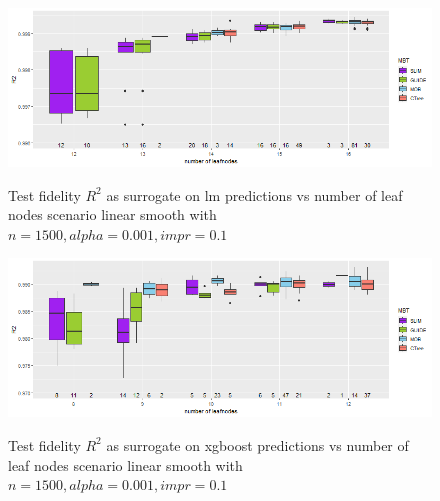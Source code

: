 \begin{figure}
\caption{Test fidelity $R^2$ as surrogate on lm predictions vs number of leaf nodes scenario linear smooth with $n=1500, alpha = 0.001, impr = 0.1$}
    \includegraphics[width=16cm]{Figures/simulations/batchtools/basic_scenarios/linear_smooth/ls_1000_lm_r2_test.png}
    \label{fig:app_ls_1000_lm_r2_test}
\end{figure} 

\begin{figure}
\caption{Test fidelity $R^2$ as surrogate on xgboost predictions vs number of leaf nodes scenario linear smooth with $n=1500, alpha = 0.001, impr = 0.1$}
    \includegraphics[width=16cm]{Figures/simulations/batchtools/basic_scenarios/linear_smooth/ls_1000_xgboost_r2_test.png}
    \label{fig:app_ls_1000_xgboost_r2_test}
\end{figure} 



